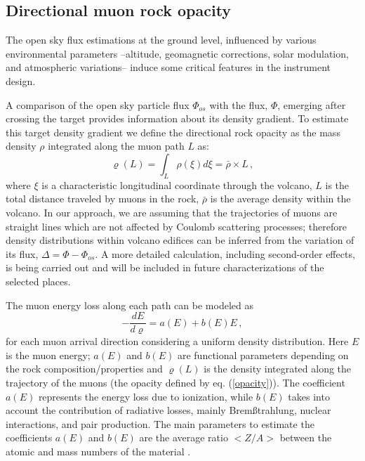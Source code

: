 \documentclass[letterpaper,10pt,titlepage,linenumber]{article}
\begin{document}
\subsection{Directional muon rock opacity}
\label{MuonOpacity}
The open sky flux estimations at the ground level, influenced by various environmental parameters --altitude, geomagnetic corrections, solar modulation, and atmospheric variations-- induce some critical features in the instrument design. 

A comparison of the open sky particle flux $\Phi_{os}$ with the flux, $\Phi$, emerging after crossing the target provides information about its density gradient. To estimate this target density gradient we define the directional rock opacity as the mass density $\rho$ integrated along the muon path $L$ as:
\begin{equation}
\varrho \left( L \right) = \int_{L} \rho \left( \xi \right) d \xi=\bar{\rho} \times L\, , 
\label{opacity}
\end{equation}
where $\xi$ is a characteristic longitudinal coordinate through the volcano, $L$ is the total distance traveled by muons in the rock, $\bar\rho$ is the average density within the volcano. In our approach, we are assuming that the trajectories of muons are straight lines which are not affected by Coulomb scattering processes; therefore density distributions within volcano edifices can be inferred from the variation of its flux, $\Delta =  \Phi -\Phi_{os}$. A more detailed calculation, including second-order effects, is being carried out and will be included in future characterizations of the selected places.

The muon energy loss along each path can be modeled as 
\begin{equation}
-\frac{dE}{d\varrho}=a(E)+b(E) E \, ,
\label{lostenergy}
\end{equation}
for each muon arrival direction considering a uniform density distribution. Here $E$ is the muon energy; $a(E)$ and $b(E)$ are functional parameters depending on the rock composition/properties and $\varrho(L)$ is the density integrated along the trajectory of the muons (the opacity defined by eq. (\ref{opacity})). The coefficient $a(E)$ represents the energy loss due to ionization, while $b(E)$ takes into account the contribution of radiative losses, mainly Brem\ss trahlung, nuclear interactions, and pair production. The main parameters to estimate the coefficients $a(E)$ and $b(E)$ are the average ratio $<Z/A>$ between the atomic and mass numbers of the material \cite{OliveEtal2014,ValenciaoteroENG2017,VesgaENG2018}.
 
\end{document}

